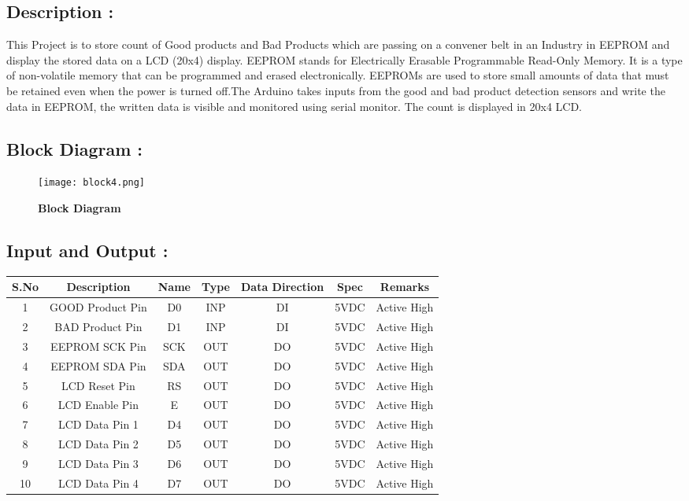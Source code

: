 \documentclass[12pt]{article}
\begin{document}
\subsection*{\textbf{Description :}}
 This Project is to store count of Good products and Bad Products which are passing on a convener belt in an Industry in EEPROM and display the stored data on a LCD (20x4) display. EEPROM stands for Electrically Erasable Programmable Read-Only Memory. It is a type of non-volatile memory that can be programmed and erased electronically. EEPROMs are used to store small amounts of data that must be retained even when the power is turned off.The Arduino takes inputs from the good and bad product detection sensors and write the data in EEPROM, the written data is visible and monitored using serial monitor. The count is displayed in 20x4 LCD.
 \subsection*{\textbf{Block Diagram :}}
 
  \begin{figure}[h]
\centering
\texttt{[image: block4.png]}
\caption{\textbf{Block Diagram}}
\label{block_diagram4}
\end{figure} 
 
 \subsection*{\textbf{Input and Output :}}
 
   \begin{tabular}{|c|c|c|c|c|c|c|}
  \hline
 \textbf{S.No }& \textbf{Description} & \textbf{Name}&\textbf{Type }& \textbf{Data Direction}  &\textbf{ Spec}& \textbf{Remarks} \\
  \hline
  1 & GOOD Product Pin & D0 & INP  & DI  &5VDC&Active High \\
  \hline
  2 & BAD Product Pin  &D1&INP  & DI  &5VDC&Active High \\
  \hline
  3 & EEPROM SCK Pin  & SCK &OUT &DO &5VDC&Active High \\
  \hline
  4 & EEPROM SDA Pin  & SDA &OUT & DO  & 5VDC&Active High \\
  \hline
  5 &LCD Reset Pin & RS &OUT &DO&5VDC&Active High \\
  \hline
  6 &LCD Enable Pin & E &OUT &DO &5VDC&Active High \\
  \hline
  7 &LCD Data Pin 1 & D4 &OUT &DO &5VDC&Active High \\
  \hline
  8 & LCD Data Pin 2& D5 &OUT & DO &5VDC&Active High \\
 \hline
  9 & LCD Data Pin 3 & D6 &OUT & DO &5VDC&Active High \\
  \hline
  10 &LCD Data Pin 4 & D7 &OUT& DO &5VDC&Active High \\
  \hline
\end{tabular}
 
\end{document}
